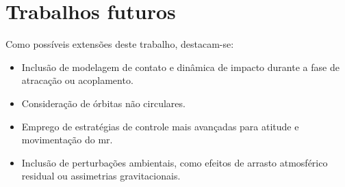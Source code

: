 \section{Trabalhos futuros}

Como possíveis extensões deste trabalho, destacam-se:

\begin{itemize}
    \item Inclusão de modelagem de contato e dinâmica de impacto durante a fase de atracação ou acoplamento.
    \item Consideração de órbitas não circulares.
    \item Emprego de estratégias de controle mais avançadas para atitude e movimentação do \gls{mr}.
    \item Inclusão de perturbações ambientais, como efeitos de arrasto atmosférico residual ou assimetrias gravitacionais.
\end{itemize}